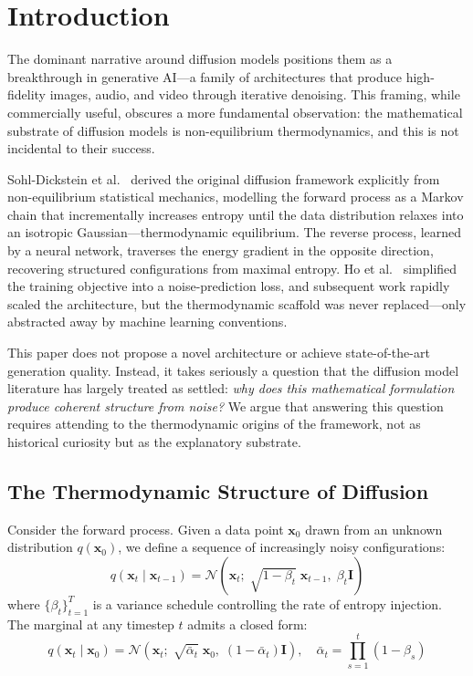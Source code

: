 \section{Introduction}
\label{sec:intro}

The dominant narrative around diffusion models positions them as a breakthrough in generative AI---a family of architectures that produce high-fidelity images, audio, and video through iterative denoising. This framing, while commercially useful, obscures a more fundamental observation: the mathematical substrate of diffusion models is non-equilibrium thermodynamics, and this is not incidental to their success.

Sohl-Dickstein et al.~\cite{sohl2015deep} derived the original diffusion framework explicitly from non-equilibrium statistical mechanics, modelling the forward process as a Markov chain that incrementally increases entropy until the data distribution relaxes into an isotropic Gaussian---thermodynamic equilibrium. The reverse process, learned by a neural network, traverses the energy gradient in the opposite direction, recovering structured configurations from maximal entropy. Ho et al.~\cite{ho2020denoising} simplified the training objective into a noise-prediction loss, and subsequent work rapidly scaled the architecture, but the thermodynamic scaffold was never replaced---only abstracted away by machine learning conventions.

This paper does not propose a novel architecture or achieve state-of-the-art generation quality. Instead, it takes seriously a question that the diffusion model literature has largely treated as settled: \emph{why does this mathematical formulation produce coherent structure from noise?} We argue that answering this question requires attending to the thermodynamic origins of the framework, not as historical curiosity but as the explanatory substrate.

\subsection{The Thermodynamic Structure of Diffusion}

Consider the forward process. Given a data point $\mathbf{x}_0$ drawn from an unknown distribution $q(\mathbf{x}_0)$, we define a sequence of increasingly noisy configurations:
%
\begin{equation}
    q(\mathbf{x}_t \mid \mathbf{x}_{t-1}) = \mathcal{N}\!\left(\mathbf{x}_t;\; \sqrt{1 - \beta_t}\;\mathbf{x}_{t-1},\; \beta_t \mathbf{I}\right)
    \label{eq:forward}
\end{equation}
%
where $\{\beta_t\}_{t=1}^{T}$ is a variance schedule controlling the rate of entropy injection. The marginal at any timestep $t$ admits a closed form:
%
\begin{equation}
    q(\mathbf{x}_t \mid \mathbf{x}_0) = \mathcal{N}\!\left(\mathbf{x}_t;\; \sqrt{\bar{\alpha}_t}\;\mathbf{x}_0,\; (1 - \bar{\alpha}_t)\mathbf{I}\right),
    \quad \bar{\alpha}_t = \prod_{s=1}^{t} (1 - \beta_s)
    \label{eq:marginal}
\end{equation}

